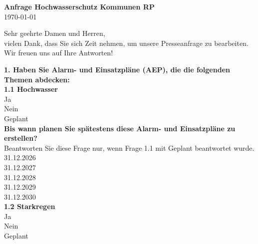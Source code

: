 \documentclass[12pt]{article}
\begin{document}
  \begin{center}
  {\LARGE \textbf{\textcolor{swr_purple}{Anfrage Hochwasserschutz Kommunen RP}}}\\[1em]
  {\large \today}
  \end{center}
  {Sehr geehrte Damen und Herren,\\ vielen Dank, dass Sie sich
  Zeit nehmen, um unsere Presseanfrage zu bearbeiten.\\
  Wir freuen uns auf Ihre Antworten!}

  \vspace{1cm}

  \begin{Form}
  \needspace{5cm}
\large \textbf{\textcolor{swr_purple}{1. Haben Sie Alarm- und Einsatzpläne (AEP), die die folgenden Themen abdecken:}}\normalsize\\[0.5em]

\needspace{5cm}
\large \textbf{\textcolor{swr_purple}{1.1 Hochwasser}}\normalsize\\[0.5em]
\ChoiceMenu[radio, name=q_G01Q02, bordercolor={0.7 0.7 0.7}]{}{= } Ja\\
\ChoiceMenu[radio, name=q_G01Q02, bordercolor={0.7 0.7 0.7}]{}{= } Nein\\
\ChoiceMenu[radio, name=q_G01Q02, bordercolor={0.7 0.7 0.7}]{}{= } Geplant\\

\needspace{5cm}
\large \textbf{\textcolor{swr_purple}{Bis wann planen Sie spätestens diese Alarm- und Einsatzpläne zu erstellen?}}\normalsize\\[0.5em]
 Beantworten Sie diese Frage nur, wenn Frage 1.1 mit Geplant beantwortet wurde.\\[0.5em]
\ChoiceMenu[radio, name=q_G01Q03, bordercolor={0.7 0.7 0.7}]{}{= } 31.12.2026\\
\ChoiceMenu[radio, name=q_G01Q03, bordercolor={0.7 0.7 0.7}]{}{= } 31.12.2027\\
\ChoiceMenu[radio, name=q_G01Q03, bordercolor={0.7 0.7 0.7}]{}{= } 31.12.2028\\
\ChoiceMenu[radio, name=q_G01Q03, bordercolor={0.7 0.7 0.7}]{}{= } 31.12.2029\\
\ChoiceMenu[radio, name=q_G01Q03, bordercolor={0.7 0.7 0.7}]{}{= } 31.12.2030\\

\needspace{5cm}
\large \textbf{\textcolor{swr_purple}{1.2 Starkregen}}\normalsize\\[0.5em]
\ChoiceMenu[radio, name=q_G01Q04, bordercolor={0.7 0.7 0.7}]{}{= } Ja\\
\ChoiceMenu[radio, name=q_G01Q04, bordercolor={0.7 0.7 0.7}]{}{= } Nein\\
\ChoiceMenu[radio, name=q_G01Q04, bordercolor={0.7 0.7 0.7}]{}{= } Geplant\\


\end{Form}
\end{document}

